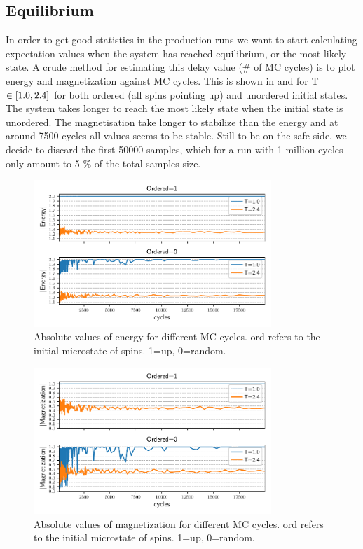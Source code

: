 \subsection{Equilibrium}
In order to get good statistics in the production runs we want to start calculating expectation values
when the system has reached equilibrium, or the most likely state. A crude
method for estimating this delay value (\# of MC cycles) is to plot energy and
magnetization against MC cycles. This is shown in  and   for T $\in \left[1.0,2.4\right]$ for both
ordered (all spins pointing up) and unordered initial states. The system takes
longer to reach the most likely state when the initial state is unordered. The
magnetisation take longer to stabilize than the energy and at around 7500
cycles all values seems to be stable. Still to be on the safe side, we decide to
discard the first 50000 samples, which for a run with 1 million cycles only
amount to 5 \% of the total samples size.

\begin{figure}[H]
  \centering
  \includegraphics[width=0.8\textwidth]{../figures/equilibrium_E.pdf}
  \caption{Absolute values of energy for different MC cycles.
  ord refers to the initial microstate of spins. 1=up, 0=random.}
  \label{fig:equi_E}
\end{figure}


\begin{figure}[H]
  \centering
  \includegraphics[width=0.8\textwidth]{../figures/equilibrium_Mabs.pdf}
  \caption{Absolute values of magnetization for different MC cycles.
  ord refers to the initial microstate of spins. 1=up, 0=random.}
  \label{fig:equi_M}
\end{figure}




